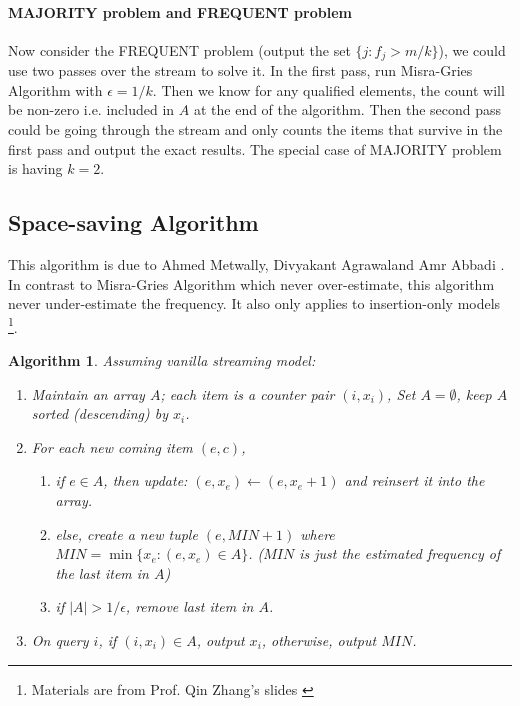 \documentclass[11pt]{article}
\theoremstyle{plain}
\newtheorem{algorithm}{Algorithm}[section]
\begin{document}
\paragraph{MAJORITY problem and FREQUENT problem} Now consider the 
FREQUENT problem (output the set $\{j : f_ j > 
m/k\}$), we could use two passes over the stream to solve it. In the first pass, 
run Misra-Gries Algorithm with $\epsilon=1/k$. Then we know for any qualified 
elements, the count will be non-zero i.e. included in $A$ at the end of the 
algorithm. Then the second pass could be going through the stream and only 
counts the items that survive in the first pass and output the exact results. The 
special case of MAJORITY problem is having $k=2$. 


\subsection{Space-saving Algorithm}
This algorithm is due to Ahmed Metwally, Divyakant Agrawaland Amr Abbadi 
\cite{Metwally05}. In contrast to Misra-Gries Algorithm which never 
over-estimate, this algorithm never under-estimate the frequency. It also only 
applies to insertion-only models \footnote{Materials are from 
	Prof. Qin Zhang's slides  \cite{zhang2017-slides}}.

\begin{algorithm}
	\label{al:space-saving}
	Assuming vanilla streaming model:
	\begin{enumerate}
		\item Maintain an array $A$; each item is a counter pair $(i, x_i)$, Set 
		$A=\emptyset$, keep $A$ sorted (descending) by $x_i$.
		\item For each new coming item $(e,c)$, 
		\begin{enumerate}
			\item if $e \in A$, then update: $(e, x_e)\leftarrow (e, x_e+1)$ and reinsert 
			it into the array. 
			\item else, create a new tuple $(e, MIN + 1)$ where
			$MIN = \min\{x_e : (e,x_e) \in A\}$. ($MIN$ is 	just the estimated frequency 
			of the last item in $A$)
		 \item  if $|A| >1/\epsilon$, remove last item in $A$. 
		\end{enumerate}
		\item On query $i$, if $(i,x_i)\in A$, output $x_i$, otherwise, output $MIN$.
	\end{enumerate}
\end{algorithm}
\end{document}
